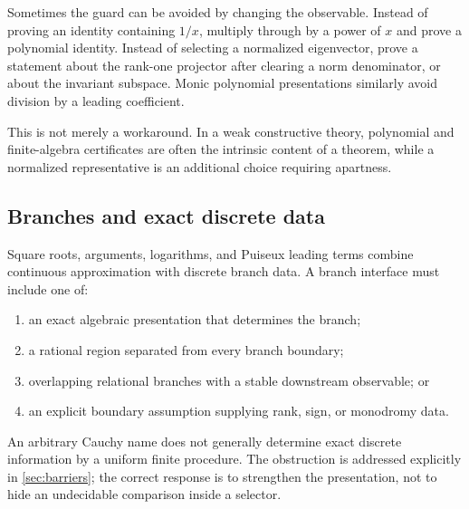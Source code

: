 Sometimes the guard can be avoided by changing the observable.  Instead of proving an
identity containing \(1/x\), multiply through by a power of \(x\) and prove a
polynomial identity.  Instead of selecting a normalized eigenvector, prove a statement
about the rank-one projector after clearing a norm denominator, or about the invariant
subspace.  Monic polynomial presentations similarly avoid division by a leading
coefficient.

This is not merely a workaround.  In a weak constructive theory, polynomial and
finite-algebra certificates are often the intrinsic content of a theorem, while a
normalized representative is an additional choice requiring apartness.

\subsection{Branches and exact discrete data}

Square roots, arguments, logarithms, and Puiseux leading terms combine continuous
approximation with discrete branch data.  A branch interface must include one of:

\begin{enumerate}[label=(\roman*),leftmargin=2.4em]
\item an exact algebraic presentation that determines the branch;
\item a rational region separated from every branch boundary;
\item overlapping relational branches with a stable downstream observable; or
\item an explicit boundary assumption supplying rank, sign, or monodromy data.
\end{enumerate}

An arbitrary Cauchy name does not generally determine exact discrete information by a
uniform finite procedure.  The obstruction is addressed explicitly in
\cref{sec:barriers}; the correct response is to strengthen the presentation, not to
hide an undecidable comparison inside a selector.
